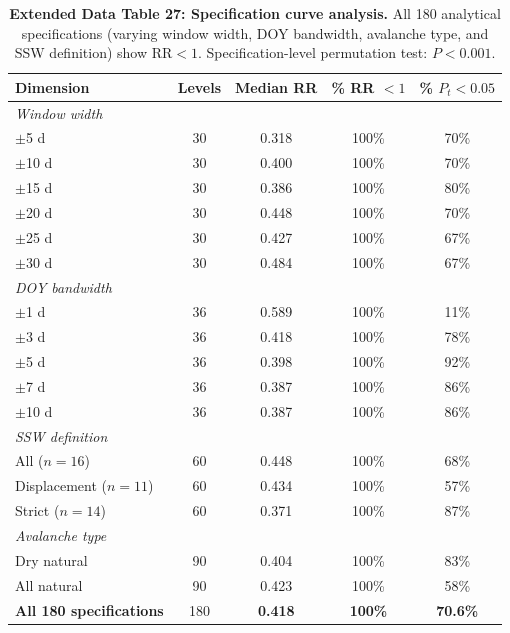 \documentclass[11pt,letterpaper]{article}
\begin{document}
\begin{table}[!ht]
\centering
\caption{\textbf{Extended Data Table 27: Specification curve analysis.}
All 180 analytical specifications (varying window width, DOY bandwidth, avalanche type, and SSW definition) show $\mathrm{RR} < 1$. Specification-level permutation test: $P < 0.001$.}
\label{tab:spec_curve}
\small
\begin{tabular}{lcccc}
\toprule
Dimension & Levels & Median RR & \% RR $< 1$ & \% $P_t < 0.05$ \\
\midrule
\multicolumn{5}{l}{\textit{Window width}} \\
$\pm$5 d & 30 & 0.318 & 100\% & 70\% \\
$\pm$10 d & 30 & 0.400 & 100\% & 70\% \\
$\pm$15 d & 30 & 0.386 & 100\% & 80\% \\
$\pm$20 d & 30 & 0.448 & 100\% & 70\% \\
$\pm$25 d & 30 & 0.427 & 100\% & 67\% \\
$\pm$30 d & 30 & 0.484 & 100\% & 67\% \\
\midrule
\multicolumn{5}{l}{\textit{DOY bandwidth}} \\
$\pm$1 d & 36 & 0.589 & 100\% & 11\% \\
$\pm$3 d & 36 & 0.418 & 100\% & 78\% \\
$\pm$5 d & 36 & 0.398 & 100\% & 92\% \\
$\pm$7 d & 36 & 0.387 & 100\% & 86\% \\
$\pm$10 d & 36 & 0.387 & 100\% & 86\% \\
\midrule
\multicolumn{5}{l}{\textit{SSW definition}} \\
All ($n = 16$) & 60 & 0.448 & 100\% & 68\% \\
Displacement ($n = 11$) & 60 & 0.434 & 100\% & 57\% \\
Strict ($n = 14$) & 60 & 0.371 & 100\% & 87\% \\
\midrule
\multicolumn{5}{l}{\textit{Avalanche type}} \\
Dry natural & 90 & 0.404 & 100\% & 83\% \\
All natural & 90 & 0.423 & 100\% & 58\% \\
\midrule
\textbf{All 180 specifications} & 180 & \textbf{0.418} & \textbf{100\%} & \textbf{70.6\%} \\
\bottomrule
\end{tabular}
\end{table}
\end{document}
